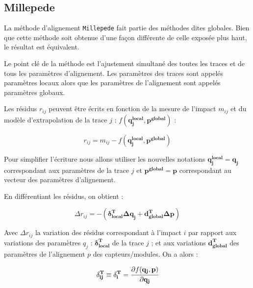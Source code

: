 
\begin{appendices} 

\chapter{Millepede}
\label{annexe:Millepede}

   La m\'ethode d'alignement \texttt{Millepede} \cite{Blobel:2002ax} \cite{Blobel20065} fait partie des m\'ethodes dites globales. Bien que cette m\'ethode soit obtenue d'une façon diff\'erente de celle expos\'ee plus haut, le r\'esultat est \'equivalent.
   
   \medskip
   
   Le point cl\'e de la m\'ethode est l'ajustement simultan\'e des toutes les traces et de tous les param\`etres d'alignement. Les param\`etres des traces sont appel\'es param\`etres locaux alors que les param\`etres de l'alignement sont appel\'es param\`etres globaux.
   
   Les r\'esidus $r_{ij}$ peuvent \^etre \'ecrits en fonction de la mesure de l'impact $m_{ij}$ et du mod\`ele d'extrapolation de la trace $j$ : $f(\mathbf{q_j^{local}},\mathbf{p^{global}})$  :
   
   \begin{equation}
   r_{ij} = m_{ij} - f(\mathbf{q_j^{local}},\mathbf{p^{global}})
   \end{equation}
   
   Pour simplifier l'\'ecriture nous allons utiliser les nouvelles notations $\mathbf{q_j^{local}} = \mathbf{q_j}$ correspondant aux param\`etres de la trace $j$ et $\mathbf{p^{global}} = \mathbf{p}$ correspondant au vecteur des param\`etres d'alignement.
   
   \medskip
   
   En diff\'erentiant les r\'esidus, on obtient :
   
   \begin{equation}
   \Delta r_{ij} = -\left( \mathbf{\delta_{local}^T} \mathbf{\Delta q_j} + \mathbf{d_{global}^T} \mathbf{\Delta p} \right)
   \end{equation}
   
   Avec $\Delta r_{ij}$ la variation des r\'esidus correspondant \`a l'impact $i$ par rapport aux variations des param\`etres $q_j$ : $\mathbf{\delta_{local}^T}$ de la trace $j$ ; et aux variations $\mathbf{d_{global}^T}$ des param\`etres de l'alignement $p$ des capteurs/modules. On a alors :
   
   \begin{equation}
    \mathbf{\delta_{ij}^T} \equiv \mathbf{\delta_i^T} = \cfrac{\partial f(\mathbf{q_j},\mathbf{p})}{\partial \mathbf{q_j} }
   \end{equation}


\end{appendices}
